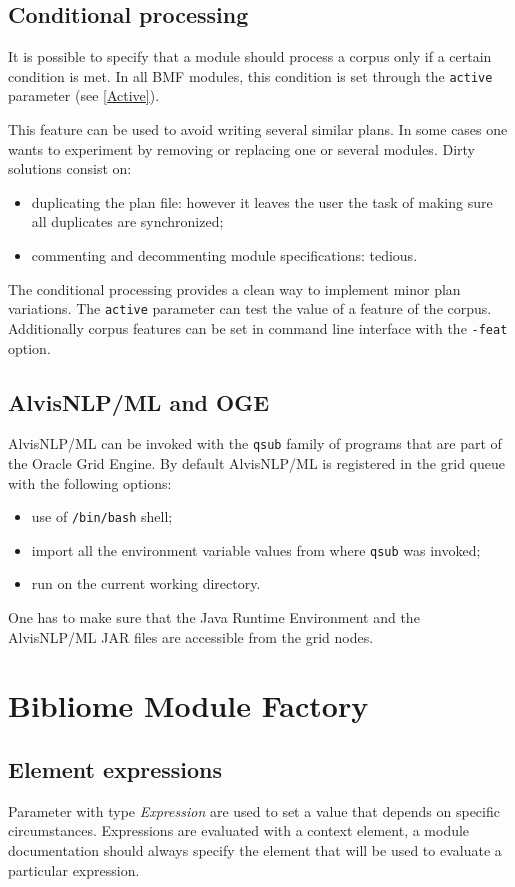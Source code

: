 \documentclass[a4paper]{book}
\begin{document}
\section{Conditional processing}
It is possible to specify that a module should process a corpus only if a certain condition is met.
In all BMF modules, this condition is set through the \texttt{active} parameter (see \ref{Active}).

This feature can be used to avoid writing several similar plans.
In some cases one wants to experiment by removing or replacing one or several modules.
Dirty solutions consist on:
\begin{itemize}
\item duplicating the plan file: however it leaves the user the task of making sure all duplicates are synchronized;
\item commenting and decommenting module specifications: tedious.
\end{itemize}

The conditional processing provides a clean way to implement minor plan variations.
The \texttt{active} parameter can test the value of a feature of the corpus.
Additionally corpus features can be set in command line interface with the \texttt{-feat} option.

\section{AlvisNLP/ML and OGE}
AlvisNLP/ML can be invoked with the \texttt{qsub} family of programs that are part of the Oracle Grid Engine.
By default AlvisNLP/ML is registered in the grid queue with the following options:
\begin{itemize}
\item use of \texttt{/bin/bash} shell;
\item import all the environment variable values from where \texttt{qsub} was invoked;
\item run on the current working directory.
\end{itemize}

One has to make sure that the Java Runtime Environment and the AlvisNLP/ML JAR files are accessible from the grid nodes.

\chapter{Bibliome Module Factory}

\section{Element expressions}
\label{Expression}
Parameter with type \emph{Expression} are used to set a value that depends on specific circumstances.
Expressions are evaluated with a context element, a module documentation should always specify the element that will be used to evaluate a particular expression.
\end{document}
